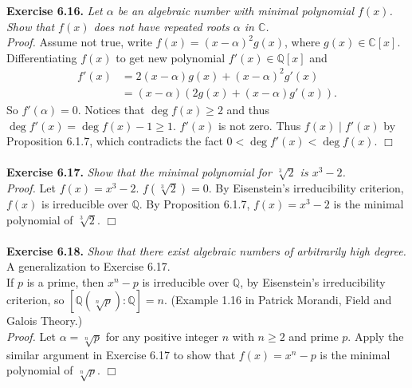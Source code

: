 \documentclass{article}
\begin{document}
\textbf{Exercise 6.16.}
\emph{Let $\alpha$ be an algebraic number with minimal polynomial $f(x)$.
Show that $f(x)$ does not have repeated roots $\alpha$ in $\mathbb{C}$.} \\

\emph{Proof.}
Assume not true, write $f(x) = (x - \alpha)^2 g(x)$,
where $g(x) \in \mathbb{C}[x]$.
Differentiating $f(x)$ to get new polynomial $f'(x) \in \mathbb{Q}[x]$ and
\begin{align*}
f'(x)
&= 2(x - \alpha) g(x) + (x - \alpha)^2 g'(x) \\
&= (x - \alpha)(2 g(x) + (x - \alpha) g'(x)).
\end{align*}
So $f'(\alpha) = 0$.
Notices that $\deg f(x) \geq 2$ and thus $\deg f'(x) = \deg f(x) - 1 \geq 1$.
$f'(x)$ is not zero. Thus $f(x) \mid f'(x)$ by Proposition 6.1.7, which
contradicts the fact $0 < \deg f'(x) < \deg f(x)$.
$\Box$ \\\\



\textbf{Exercise 6.17.}
\emph{Show that the minimal polynomial for $\sqrt[3]{2}$ is $x^3 - 2$.} \\

\emph{Proof.}
Let $f(x) = x^3 - 2$. $f(\sqrt[3]{2}) = 0$.
By Eisenstein's irreducibility criterion, $f(x)$ is irreducible over $\mathbb{Q}$.
By Proposition 6.1.7, $f(x) = x^3 - 2$ is the minimal polynomial of $\sqrt[3]{2}$.
$\Box$ \\\\



\textbf{Exercise 6.18.}
\emph{Show that there exist algebraic numbers of arbitrarily high degree.} \\

A generalization to Exercise 6.17. \\

If $p$ is a prime, then $x^n - p$ is irreducible over $\mathbb{Q}$,
by Eisenstein's irreducibility criterion, so
$[\mathbb{Q}(\sqrt[n]{p}):\mathbb{Q}] = n$.
(Example 1.16 in Patrick Morandi, Field and Galois Theory.) \\


\emph{Proof.}
Let $\alpha = \sqrt[n]{p}$ for any positive integer $n$ with $n \geq 2$
and prime $p$.
Apply the similar argument in Exercise 6.17 to show that
$f(x) = x^n - p$ is the minimal polynomial of $\sqrt[n]{p}$.
$\Box$ \\\\
\end{document}
